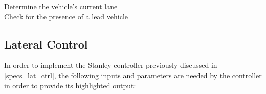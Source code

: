 \begin{enumerate}
            \begin{algorithm}[H]
                \SetAlgoLined
                Determine the vehicle's current lane\\
                Check for the presence of a lead vehicle\\
                \caption{Krauss Model Algorithm (every \(\Delta t\))}
                \label{krauss_alg}
            \end{algorithm} 

\end{enumerate}

\subsection{Lateral Control}
\label{method_lat_ctrl}
In order to implement the Stanley controller previously discussed in \ref{specs_lat_ctrl}, the following inputs and parameters are needed by the controller in order to provide its highlighted output:

